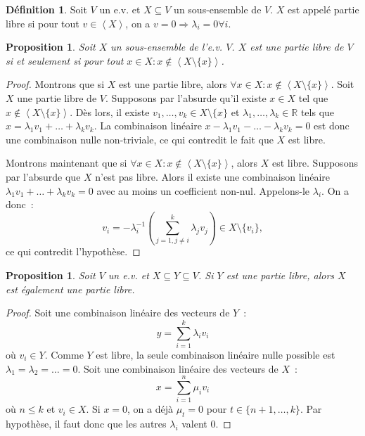 \documentclass{article}
\newcommand{\R}{\mathbb R}
\newcommand{\eng}[1]{\left\langle#1\right\rangle}
\newtheorem{prp}[thm]{Proposition}
\theoremstyle{definition}
\newtheorem{déf}[thm]{Définition}
\theoremstyle{remark}
\begin{document}
		\begin{déf} Soit $V$ un e.v. et $X \subseteq V$ un sous-ensemble de $V$. $X$ est appelé partie libre si pour tout $v \in \eng X$, on a
		$v = 0 \Rightarrow \lambda_i = 0 \forall i$. \end{déf}

		\begin{prp}\label{conditionsPartieLibre} Soit $X$ un sous-ensemble de l'e.v. $V$. $X$ est une partie libre de $V$ si et seulement si pour tout
		$x \in X : x \not \in \eng {X \setminus \{x\}}$. \end{prp}

		\begin{proof} Montrons que si $X$ est une partie libre, alors $\forall x \in X : x \not \in \eng {X \setminus \{x\}}$. Soit $X$ une partie libre de $V$.
		Supposons par l'absurde qu'il existe $x \in X$ tel que $x \not \in \eng {X \setminus \{x\}}$. Dès lors, il existe $v_1, \dotsc, v_k \in X \setminus \{x\}$ et
		$\lambda_1, \dotsc, \lambda_k \in \R$ tels que $x = \lambda_1v_1 + \ldots + \lambda_kv_k$. La combinaison linéaire $x - \lambda_1v_1 - \ldots - \lambda_kv_k = 0$
		est donc une combinaison nulle non-triviale, ce qui contredit le fait que $X$ est libre.

		Montrons maintenant que si $\forall x \in X : x \not \in \eng {X \setminus \{x\}}$, alors $X$ est libre. Supposons par l'absurde que $X$ n'est pas libre. Alors
		il existe une combinaison linéaire $\lambda_1v_1 + \ldots + \lambda_kv_k = 0$ avec au moins un coefficient non-nul. Appelons-le $\lambda_i$. On a donc~:
		\[v_i = -\lambda_i^{-1}\left(\sum_{j=1, j \neq i}^k\lambda_jv_j\right) \in X \setminus \{v_i\},\] ce qui contredit l'hypothèse. \end{proof}

		\begin{prp} Soit $V$ un e.v. et $X \subseteq Y \subseteq V$. Si $Y$ est une partie libre, alors $X$ est également une partie libre. \end{prp}

		\begin{proof} Soit une combinaison linéaire des vecteurs de $Y$~: \[y = \sum_{i=1}^k\lambda_iv_i\] où $v_i \in Y$. Comme $Y$ est libre, la seule combinaison
		linéaire nulle possible est $\lambda_1 = \lambda_2 = \ldots = 0$. Soit une combinaison linéaire des vecteurs de $X$~: \[x = \sum_{i=1}^n\mu_iv_i\] où
		$n \leq k$ et $v_i \in X$. Si $x = 0$, on a déjà $\mu_t = 0$ pour $t \in \{n+1, \dotsc, k\}$. Par hypothèse, il faut donc que les autres $\lambda_i$ valent $0$.
		\end{proof}
\end{document}
